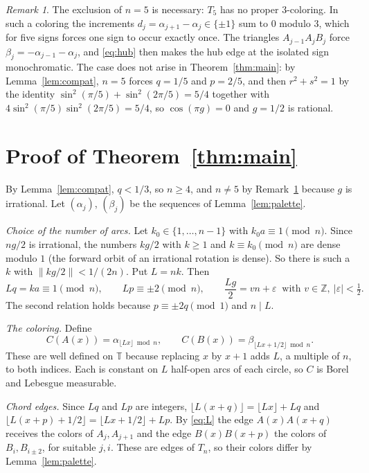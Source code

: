 \documentclass[11pt]{amsart}
\theoremstyle{remark}
\newtheorem{remark}[theorem]{Remark}
\numberwithin{equation}{section}
\newcommand{\T}{\mathbb{T}}
\newcommand{\Z}{\mathbb{Z}}
\begin{document}
\begin{remark}\label{rem:five}
The exclusion of $n=5$ is necessary: $T_5$ has no proper $3$-coloring.
In such a coloring the increments $d_j=\alpha_{j+1}-\alpha_j\in\{\pm1\}$ sum to $0$
modulo $3$, which for five signs forces one sign to occur exactly once.
The triangles $A_{j-1}A_jB_j$ force $\beta_j=-\alpha_{j-1}-\alpha_j$, and
\eqref{eq:hub} then makes the hub edge at the isolated sign
monochromatic. The case does not arise in Theorem~\ref{thm:main}: by
Lemma~\ref{lem:compat}, $n=5$ forces $q=1/5$ and $p=2/5$, and then
$r^2+s^2=1$ by the identity
$\sin^2(\pi/5)+\sin^2(2\pi/5)=5/4$ together with
$4\sin^2(\pi/5)\sin^2(2\pi/5)=5/4$, so $\cos(\pi g)=0$ and $g=1/2$ is
rational.
\end{remark}

\section{Proof of Theorem~\ref{thm:main}}\label{sec:proof}

By Lemma~\ref{lem:compat}, $q<1/3$, so
$n\ge4$, and $n\ne5$ by Remark~\ref{rem:five} because $g$ is
irrational. Let $(\alpha_j)$, $(\beta_j)$ be the sequences of
Lemma~\ref{lem:palette}.

\emph{Choice of the number of arcs.} Let $k_0\in\{1,\dots,n-1\}$ with
$k_0a\equiv1\pmod n$. Since $ng/2$ is irrational, the numbers $kg/2$
with $k\ge1$ and $k\equiv k_0\pmod n$ are dense modulo $1$ (the forward
orbit of an irrational rotation is dense). So there is such a $k$ with
$\|kg/2\|<1/(2n)$. Put $L=nk$. Then
\begin{equation}\label{eq:L}
Lq=ka\equiv1\pmod n,\qquad Lp\equiv\pm2\pmod n,\qquad
\frac{Lg}{2}=vn+\varepsilon\ \text{ with } v\in\Z,\ |\varepsilon|<\tfrac12.
\end{equation}
The second relation holds because $p\equiv\pm2q\pmod1$ and $n\mid L$.

\emph{The coloring.} Define
\begin{equation}\label{eq:color}
C(A(x))=\alpha_{\lfloor Lx\rfloor\bmod n},\qquad
C(B(x))=\beta_{\lfloor Lx+1/2\rfloor\bmod n}.
\end{equation}
These are well defined on $\T$ because replacing $x$ by $x+1$ adds $L$,
a multiple of $n$, to both indices. Each is constant on $L$ half-open
arcs of each circle, so $C$ is Borel and Lebesgue measurable.

\emph{Chord edges.} Since $Lq$ and $Lp$ are integers,
$\lfloor L(x+q)\rfloor=\lfloor Lx\rfloor+Lq$ and
$\lfloor L(x+p)+1/2\rfloor=\lfloor Lx+1/2\rfloor+Lp$. By \eqref{eq:L}
the edge $A(x)A(x+q)$ receives the colors of $A_j,A_{j+1}$ and the edge
$B(x)B(x+p)$ the colors of $B_i,B_{i\pm2}$, for suitable $j,i$. These
are edges of $T_n$, so their colors differ by Lemma~\ref{lem:palette}.
\end{document}
